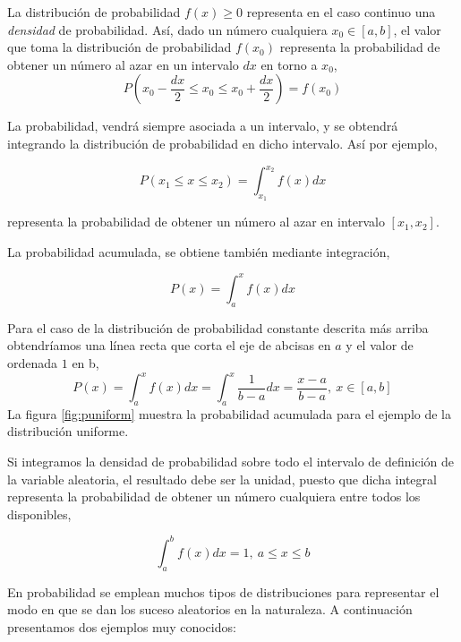 La distribución de probabilidad $f(x)\geqslant 0$ representa en el caso continuo una \emph{densidad} de probabilidad. Así, dado un número cualquiera $x_0 \in [a,b]$, el valor que toma la distribución de probabilidad $f(x_0)$ representa la probabilidad de obtener un número al azar en un intervalo $dx$ en torno a $x_0$,
\begin{equation*}
P\left(x_0-\frac{dx}{2}\leqslant x_0 \leqslant x_0+\frac{dx}{2}\right) = f(x_0)
\end{equation*} 

La probabilidad, vendrá siempre asociada a un intervalo, y se obtendrá integrando la distribución de probabilidad en dicho intervalo. Así por ejemplo,

\begin{equation*}
P(x_1 \leqslant x \leqslant x_2) = \int_{x_1}^{x_2}f(x)dx
\end{equation*}

representa la probabilidad de obtener un número al azar en intervalo $[x_1,x_2]$. 

La probabilidad acumulada, se obtiene también mediante integración, 

\begin{equation*}
P(x) = \int_a^xf(x)dx
\end{equation*}

Para el caso de la distribución de probabilidad constante descrita más arriba obtendríamos una línea recta que corta el eje de abcisas en $a$ y el valor de ordenada $1$ en b,
\begin{equation*}
P(x) = \int_a^xf(x)dx = \int_a^x \frac{1}{b-a}dx = \frac{x-a}{b-a}, \ x \in[a,b]
\end{equation*}
La figura \ref{fig:puniform} muestra la probabilidad acumulada para el ejemplo de la distribución uniforme. 

Si integramos la densidad de probabilidad sobre todo el intervalo de definición de la variable aleatoria, el resultado debe ser la unidad, puesto que dicha integral representa la probabilidad de obtener un número cualquiera entre todos los disponibles,

\begin{equation*}
\int_a^b f(x)dx =1, \ a\leqslant x \leqslant b
\end{equation*}

En probabilidad se emplean muchos tipos de distribuciones para representar el modo en que se dan los suceso aleatorios en la naturaleza. A continuación presentamos dos ejemplos muy conocidos:

